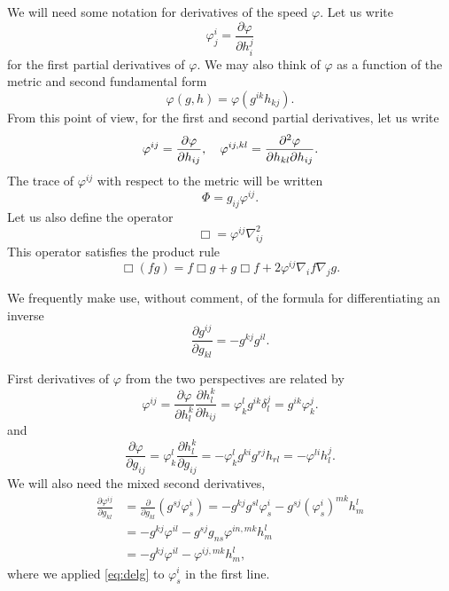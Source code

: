 \documentclass{amsart}
\begin{document}
We will need some notation for derivatives of the speed \(\varphi\). Let us write
\[
\varphi^{i}_{j} = \frac{\partial \varphi}{\partial h^{j}_{i}}
\]
for the first partial derivatives of \(\varphi\). We may also think of \(\varphi\) as a function of the metric and second fundamental form
\[
\varphi(g, h) = \varphi(g^{ik} h_{kj}).
\]
From this point of view, for the first and second partial derivatives, let us write
\[
\varphi^{ij} = \frac{\partial\varphi}{\partial h_{ij}}, \quad \varphi^{ij,kl} = \frac{\partial^2\varphi}{\partial h_{kl} \partial h_{ij}}.
\]
The trace of \(\varphi^{ij}\) with respect to the metric will be written
\[
\Phi = g_{ij} \varphi^{ij}.
\]
Let us also define the operator
\[
\Box = \varphi^{ij} \nabla^2_{ij}
\]
This operator satisfies the product rule
\begin{equation}
\label{eq:productbox}
\Box (fg) = f \Box g + g \Box f + 2 \varphi^{ij} \nabla_i f \nabla_j g.
\end{equation}

We frequently make use, without comment, of the formula for differentiating an inverse
\[
\frac{\partial g^{ij}}{\partial g_{kl}} = - g^{kj} g^{il}.
\]

First derivatives of \(\varphi\) from the two perspectives are related by
\begin{equation}
\label{eq:delh}
\varphi^{ij} = \frac{\partial \varphi}{\partial h_l^k} \frac{\partial h_l^k}{\partial h_{ij}} = \varphi^l_k g^{ik} \delta^j_l = g^{ik} \varphi^j_k.
\end{equation}
and
\begin{equation}
\label{eq:delg}
\frac{\partial\varphi}{\partial g_{ij}} = \varphi^{l}_{k} \frac{\partial h^{k}_{l}}{\partial g_{ij}} = -\varphi^{l}_{k} g^{ki} g^{rj} h_{rl} = -\varphi^{li}h^{j}_{l}.
\end{equation}
We will also need the mixed second derivatives,
\begin{equation}
\label{eq:delhdelg}
\begin{split}
\frac{\partial \varphi^{ij}}{\partial g_{kl}} &= \frac{\partial}{\partial g_{kl}} \left(g^{sj} \varphi^{i}_{s} \right) = - g^{kj}g^{sl} \varphi^{i}_{s} - g^{sj} (\varphi^i_s)^{mk} h^l_m \\
&= - g^{kj} \varphi^{il} - g^{sj} g_{ns} \varphi^{in,mk} h^l_m \\
&= - g^{kj} \varphi^{il} - \varphi^{ij,mk} h^l_m,
\end{split}
\end{equation}
where we applied \cref{eq:delg} to \(\varphi^i_s\) in the first line.
\end{document}
